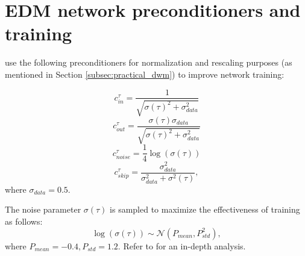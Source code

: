 \section{\textsc{EDM} network preconditioners and training}
\label{appendix:karras_conditioners}

\citet{karras2022elucidating} use the following preconditioners for normalization and rescaling purposes (as mentioned in Section \ref{subsec:practical_dwm}) to improve network training:

\begin{equation}
    c_{in}^\tau = \frac{1}{\sqrt{\sigma(\tau)^2 + \sigma_{data}^2}}
\end{equation}
\begin{equation}
    c_{out}^\tau = \frac{\sigma(\tau)\sigma_{data}}{\sqrt{\sigma(\tau)^2 + \sigma_{data}^2}}
\end{equation}
\begin{equation}
    c_{noise}^\tau = \frac{1}{4}\log(\sigma(\tau))
\end{equation}
\begin{equation}
    c_{skip}^\tau = \frac{\sigma_{data}^2}{\sigma_{data}^2 + \sigma^2(\tau)},
\end{equation}
where $\sigma_{data}=0.5$.

The noise parameter $\sigma(\tau)$ is sampled to maximize the effectiveness of training as follows:
\begin{equation}
\log(\sigma(\tau))\sim \mathcal{N}(P_{mean}, P_{std}^2),
\end{equation}
where $P_{mean}=-0.4, P_{std}=1.2$. Refer to \citet{karras2022elucidating} for an in-depth analysis.